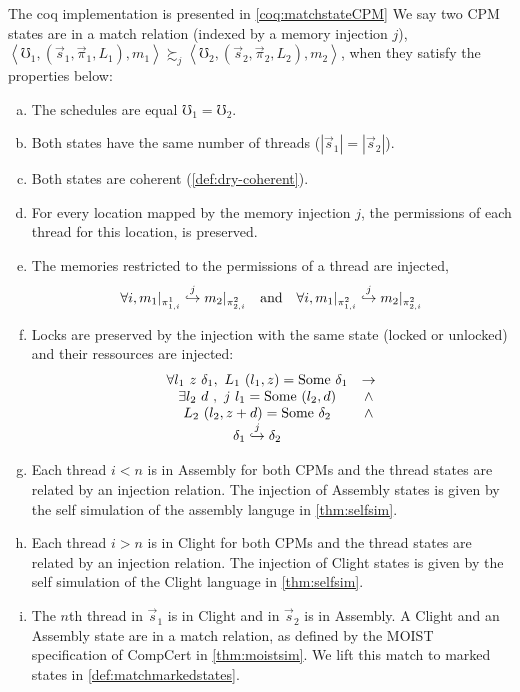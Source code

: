 \begin{fndefinition}{The coq implementation is presented in \cref{coq:matchstateCPM}}\label{def:CPMmatch} We say two CPM states are in a match relation (indexed by a memory injection $j$),
$\left<\mho_1, (\vec{s}_1, \vec{\pi}_1, L_1), m_1 \right>  \succsim_j \left<\mho_2, (\vec{s}_2, \vec{\pi}_2, L_2), m_2 \right> $,
when they satisfy the properties below:
\begin{enumerate}[(a)]
\item The schedules are equal $\mho_1 = \mho_2$.
\item Both states have the same number of threads ($|\vec{s}_1| = |\vec{s}_2|$).
\item Both states are coherent (\cref{def:dry-coherent}).
\item For every location mapped by the memory injection $j$, the permissions of each thread for this location, is preserved.
\item The memories restricted to the permissions of a thread are injected, 
$$\forall i, \setcur{m_1}{\pi^1_{1,i}} \injarrow{j} \setcur{m_2}{\pi^2_{2,i}} \ \ \text{ and } \ \ \forall i, \setcur{m_1}{\pi^2_{1,i}} \injarrow{j} \setcur{m_2}{\pi^2_{2,i}}$$
\item Locks are preserved by the injection with the same state (locked or unlocked) and their ressources are injected:
$$ \begin{array}{cc} 
\forall l_1 \ z \ \delta_1,  ~ L_1\ (l_1,z) = \text{Some } \delta_1 & \rightarrow \\
\exists l_2 \ d \ , ~ j ~ l_1 = \text{Some }(l_2,d) &\wedge	\\
	L_2\ (l_2,z+d) = \text{Some } \delta_2 &\wedge \\
	\delta_1 \overset{j}{\hookrightarrow} \delta_2
	\end{array}
	$$
\item Each thread $i<n$ is in Assembly for both CPMs and the thread states are related by an injection relation. The injection of Assembly states is given by the self simulation of the assembly languge in \cref{thm:selfsim}. %
\item Each thread $i>n$ is in Clight for both CPMs and the thread states are related by an injection relation. The injection of Clight states is given by the self simulation of the Clight language in \cref{thm:selfsim}. %
\item The $n$th thread in $\vec{s}_1$ is in Clight and in $\vec{s}_2$ is in Assembly. A Clight and an Assembly state are in a match relation, as defined by the MOIST specification of CompCert in \cref{thm:moistsim}. We lift this match to marked states in \cref{def:matchmarkedstates}. 
\end{enumerate}
\end{fndefinition}

